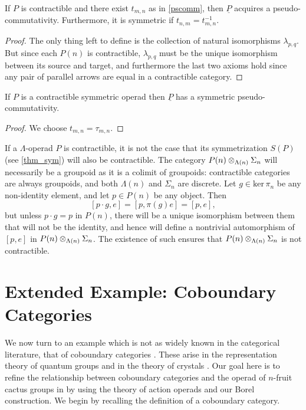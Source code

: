 \begin{cor}
If $P$ is contractible and there exist $t_{m,n}$ as in \cref{pscomm}, then $\underline{P}$ acquires a pseudo-commutativity. Furthermore, it is symmetric if $t_{n,m} = t_{m,n}^{-1}$.
\end{cor}
\begin{proof}
The only thing left to define is the collection of natural isomorphisms $\lambda_{p,q}$. But since each $P(n)$ is contractible, $\lambda_{p,q}$ must be the unique isomorphism between its source and target, and furthermore the last two axioms hold since any pair of parallel arrows are equal in a contractible category.
\end{proof}

\begin{cor}
If $P$ is a contractible symmetric operad then $\underline{P}$ has a symmetric pseudo-commutativity.
\end{cor}
\begin{proof}
We choose $t_{m,n} = \tau_{m,n}$.
\end{proof}

\begin{rem}
If a $\Lambda$-operad $P$ is contractible, it is not the case that its symmetrization $S(P)$ (see \cref{thm_sym}) will also be contractible. The category $P(n) \otimes_{\Lambda(n)} \Sigma_{n}$ will necessarily be a groupoid as it is a colimit of groupoids: contractible categories are always groupoids, and both $\Lambda(n)$ and $\Sigma_{n}$ are discrete. Let $g \in \textrm{ker} \, \pi_{n}$ be any non-identity element, and let $p \in P(n)$ be any object. Then
  \[
    [p \cdot g, e] = [p, \pi(g)e] = [p,e],
  \]
but unless $p\cdot g = p$ in $P(n)$, there will be a unique isomorphism between them that will not be the identity, and hence will define a nontrivial automorphism of $[p,e]$ in  $P(n) \otimes_{\Lambda(n)} \Sigma_{n}$. The existence of such ensures that $P(n) \otimes_{\Lambda(n)} \Sigma_{n}$ is not contractible.
\end{rem}



\section{Extended Example: Coboundary Categories}

We now turn to an example which is not as widely known in the categorical literature, that of coboundary categories \cite{drin-quasihopf}. These arise in the representation theory of quantum groups and in the theory of crystals \cite{hk-cobound, hk-quantum}. Our goal here is to refine the relationship between coboundary categories and the operad of $n$-fruit cactus groups in \cite{hk-cobound} by using the theory of action operads and our Borel construction. We begin by recalling the definition of a coboundary category.


